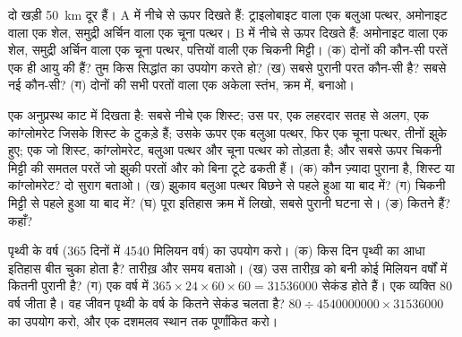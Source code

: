 \begin{exercise}[$\star\star$]\label{exo:g7:geological-time:10}
दो खड़ी  \qty{50}{km} दूर हैं।  A में नीचे से ऊपर दिखते हैं: ट्राइलोबाइट
वाला एक बलुआ पत्थर, अमोनाइट वाला एक शेल, समुद्री अर्चिन वाला एक चूना पत्थर। 
B में नीचे से ऊपर दिखते हैं: अमोनाइट वाला एक शेल, समुद्री अर्चिन वाला एक चूना
पत्थर, पत्तियों वाली एक चिकनी मिट्टी। (क) दोनों  की कौन-सी परतें एक ही आयु
की हैं? तुम किस सिद्धांत का उपयोग करते हो? (ख) सबसे पुरानी परत कौन-सी है? सबसे नई
कौन-सी? (ग) दोनों  की सभी परतों वाला एक अकेला स्तंभ, क्रम में,
बनाओ।
\end{exercise}

\begin{exercise}[$\star\star\star$]\label{exo:g7:geological-time:11}
एक अनुप्रस्थ काट में दिखता है: सबसे नीचे एक शिस्ट; उस पर, एक लहरदार  सतह से
अलग, एक कांग्लोमरेट जिसके  शिस्ट के टुकड़े हैं; उसके ऊपर एक बलुआ पत्थर, फिर एक
चूना पत्थर, तीनों झुके हुए; एक  जो शिस्ट, कांग्लोमरेट, बलुआ पत्थर और चूना
पत्थर को तोड़ता है; और सबसे ऊपर चिकनी मिट्टी की समतल परतें जो झुकी परतों और 
को बिना टूटे ढकती हैं। (क) कौन ज़्यादा पुराना है, शिस्ट या कांग्लोमरेट? दो सुराग
बताओ। (ख) झुकाव बलुआ पत्थर बिछने से पहले हुआ या बाद में? (ग)  चिकनी मिट्टी से
पहले हुआ या बाद में? (घ) पूरा इतिहास क्रम में लिखो, सबसे पुरानी घटना से। (ङ) कितने
 हैं? कहाँ?
\end{exercise}

\begin{exercise}[$\star\star\star$]\label{exo:g7:geological-time:12}
पृथ्वी के वर्ष (365 दिनों में \num{4540} मिलियन वर्ष) का उपयोग करो। (क) किस दिन
पृथ्वी का आधा इतिहास बीत चुका होता है? तारीख़ और समय बताओ। (ख) उस तारीख़ को बनी कोई
 मिलियन वर्षों में कितनी पुरानी है? (ग) एक वर्ष में
$365 \times 24 \times 60 \times 60 = \num{31536000}$ सेकंड होते हैं। एक व्यक्ति 80 वर्ष जीता है। वह जीवन
पृथ्वी के वर्ष के कितने सेकंड चलता है? $80 \div \num{4540000000} \times
\num{31536000}$ का उपयोग करो, और एक दशमलव स्थान तक पूर्णांकित करो।
\end{exercise}


